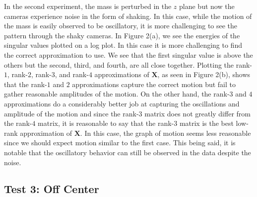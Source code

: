 \documentclass[12pt]{article}%
\begin{document}
In the second experiment, the mass is perturbed in the $z$ plane but now the cameras experience noise in the form of shaking. In this case, while the motion of the mass is easily observed to be oscillatory, it is more challenging to see the pattern through the shaky cameras. In Figure 2(a), we see the energies of the singular values plotted on a log plot. In this case it is more challenging to find the correct approximation to use. We see that the first singular value is above the others but the second, third, and fourth, are all close together. Plotting the rank-$1$, rank-$2$, rank-$3$, and rank-$4$ approximations of $\mathbf{X}$, as seen in Figure 2(b), shows that the rank-$1$ and $2$ approximations capture the correct motion but fail to gather reasonable amplitudes of the motion. On the other hand, the rank-$3$ and $4$ approximations do a considerably better job at capturing the oscillations and amplitude of the motion and since the rank-$3$ matrix does not greatly differ from the rank-$4$ matrix, it is reasonable to say that the rank-$3$ matrix is the best low-rank approximation of $\mathbf{X}$. In this case, the graph of motion seems less reasonable since we should expect motion similar to the first case. This being said, it is notable that the oscillatory behavior can still be observed in the data despite the noise. 

\subsection{Test 3: Off Center}
\end{document}
